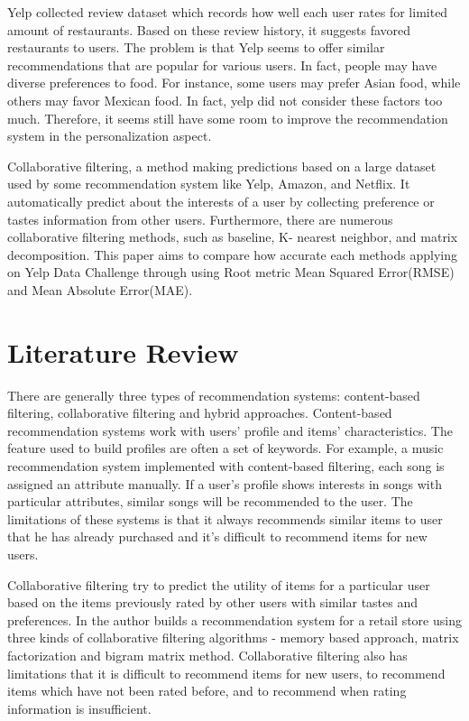 \documentclass{llncs}
\begin{document}
Yelp collected review dataset which records how well each user rates for limited amount of restaurants. Based on these review history, it suggests favored restaurants to users. The problem is that Yelp seems to offer similar recommendations that are popular for various users. In fact, people may have diverse preferences to food. For instance, some users may prefer Asian food, while others may favor Mexican food. In fact, yelp did not consider these factors too much. Therefore, it seems still have some room to improve the recommendation system in the personalization aspect.

Collaborative filtering, a method making predictions based on a large dataset used by some recommendation system like Yelp, Amazon, and Netflix. It automatically predict about the interests of a user by collecting preference or tastes information from other users. Furthermore, there are numerous collaborative filtering methods, such as baseline, K- nearest neighbor, and matrix decomposition. This paper aims to compare how accurate each methods applying on Yelp Data Challenge through using Root metric Mean Squared Error(RMSE) and Mean Absolute Error(MAE).

\section{Literature Review}
There are generally three types of recommendation systems: content-based filtering, collaborative filtering and hybrid approaches. Content-based recommendation systems work with users’ profile and items’ characteristics. The feature used to build profiles are often a set of keywords. For example, a music recommendation system\cite{MJ} implemented with content-based filtering, each song is assigned an attribute manually. If a user’s profile shows interests in songs with particular attributes, similar songs will be recommended to the user. The limitations of these systems is that it always recommends similar items to user that he has already purchased and it’s difficult to recommend items for new users. 

Collaborative filtering try to predict the utility of items for a particular user based on the items previously rated by other users with similar tastes and preferences. In\cite{Bruno} the author builds a recommendation system for a retail store using three kinds of collaborative filtering algorithms - memory based approach, matrix factorization and bigram matrix method. Collaborative filtering also has limitations that it is difficult to recommend items for new users, to recommend items which have not been rated before, and to recommend when rating information is insufficient. 
\end{document}
